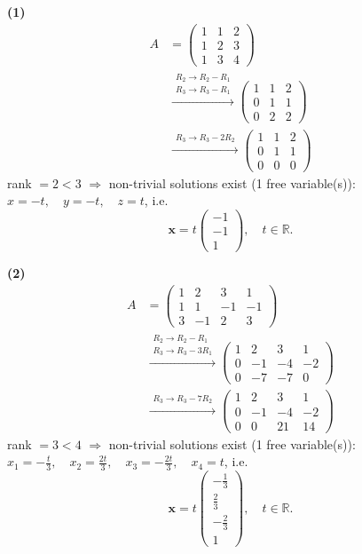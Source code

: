 \noindent\textbf{(1)}
\begin{align*}
A &= \begin{pmatrix}1 & 1 & 2 \\ 1 & 2 & 3 \\ 1 & 3 & 4\end{pmatrix} \\
&\xrightarrow{\substack{R_2\to R_2-R_1\\ R_3\to R_3-R_1}} \begin{pmatrix}1 & 1 & 2 \\ 0 & 1 & 1 \\ 0 & 2 & 2\end{pmatrix} \\
&\xrightarrow{\substack{R_3\to R_3-2R_2}} \begin{pmatrix}1 & 1 & 2 \\ 0 & 1 & 1 \\ 0 & 0 & 0\end{pmatrix}
\end{align*}
rank $=2<3$ $\Rightarrow$ non-trivial solutions exist (1 free variable(s)): $x=- t, \quad y=- t, \quad z=t$, i.e. \[ \mathbf{x}=t\begin{pmatrix}-1 \\ -1 \\ 1\end{pmatrix}, \quad t\in\mathbb{R}. \]

\noindent\textbf{(2)}
\begin{align*}
A &= \begin{pmatrix}1 & 2 & 3 & 1 \\ 1 & 1 & -1 & -1 \\ 3 & -1 & 2 & 3\end{pmatrix} \\
&\xrightarrow{\substack{R_2\to R_2-R_1\\ R_3\to R_3-3R_1}} \begin{pmatrix}1 & 2 & 3 & 1 \\ 0 & -1 & -4 & -2 \\ 0 & -7 & -7 & 0\end{pmatrix} \\
&\xrightarrow{\substack{R_3\to R_3-7R_2}} \begin{pmatrix}1 & 2 & 3 & 1 \\ 0 & -1 & -4 & -2 \\ 0 & 0 & 21 & 14\end{pmatrix}
\end{align*}
rank $=3<4$ $\Rightarrow$ non-trivial solutions exist (1 free variable(s)): $x_1=- \frac{t}{3}, \quad x_2=\frac{2 t}{3}, \quad x_3=- \frac{2 t}{3}, \quad x_4=t$, i.e. \[ \mathbf{x}=t\begin{pmatrix}- \frac{1}{3} \\ \frac{2}{3} \\ - \frac{2}{3} \\ 1\end{pmatrix}, \quad t\in\mathbb{R}. \]


